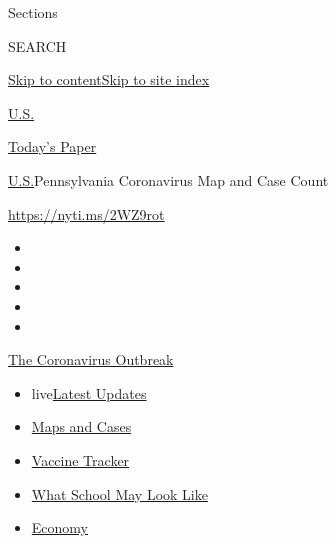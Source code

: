 Sections

SEARCH

\protect\hyperlink{site-content}{Skip to
content}\protect\hyperlink{site-index}{Skip to site index}

\href{https://www.nytimes.com/section/us}{U.S.}

\href{https://myaccount.nytimes.com/auth/login?response_type=cookie\&client_id=vi}{}

\href{https://www.nytimes.com/section/todayspaper}{Today's Paper}

\href{/section/us}{U.S.}\textbar{}Pennsylvania Coronavirus Map and Case
Count

\url{https://nyti.ms/2WZ9rot}

\begin{itemize}
\item
\item
\item
\item
\item
\end{itemize}

\href{https://www.nytimes.com/news-event/coronavirus?action=click\&pgtype=Article\&state=default\&region=TOP_BANNER\&context=storylines_menu}{The
Coronavirus Outbreak}

\begin{itemize}
\tightlist
\item
  live\href{https://www.nytimes.com/2020/08/01/world/coronavirus-covid-19.html?action=click\&pgtype=Article\&state=default\&region=TOP_BANNER\&context=storylines_menu}{Latest
  Updates}
\item
  \href{https://www.nytimes.com/interactive/2020/us/coronavirus-us-cases.html?action=click\&pgtype=Article\&state=default\&region=TOP_BANNER\&context=storylines_menu}{Maps
  and Cases}
\item
  \href{https://www.nytimes.com/interactive/2020/science/coronavirus-vaccine-tracker.html?action=click\&pgtype=Article\&state=default\&region=TOP_BANNER\&context=storylines_menu}{Vaccine
  Tracker}
\item
  \href{https://www.nytimes.com/interactive/2020/07/29/us/schools-reopening-coronavirus.html?action=click\&pgtype=Article\&state=default\&region=TOP_BANNER\&context=storylines_menu}{What
  School May Look Like}
\item
  \href{https://www.nytimes.com/live/2020/07/31/business/stock-market-today-coronavirus?action=click\&pgtype=Article\&state=default\&region=TOP_BANNER\&context=storylines_menu}{Economy}
\end{itemize}

